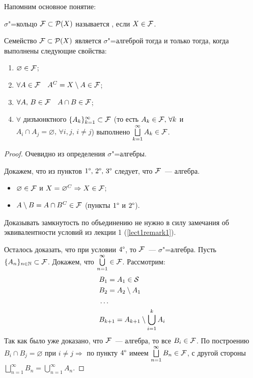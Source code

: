 Напомним основное понятие:
\begin{definition}
    $\sigma$"=кольцо $\mathcal{F} \subset\mathcal{P}(X)$ называется , если $X\in\mathcal{F} $.
\end{definition}

\begin{claim}[Критерий $\sigma$"=алгебры]
    Семейство $\mathcal{F} \subset \mathcal{P}(X)$ является $\sigma$"=алгеброй тогда и только тогда, когда выполнены следующие свойства:
    \begin{enumerate}[label=\arabic*\degree.]
        \item $\varnothing\in\mathcal{F} $;
        \item $\forall A\in\mathcal{F}  \quad A^C=X\setminus A\in\mathcal{F} $;
        \item $\forall A,\, B\in\mathcal{F} \quad A\cap B\in\mathcal{F} $;
        \item $\forall$ дизъюнктного $\{A_k\}_{k=1}^{\infty}\subset \mathcal{F} $ (то есть $A_k\in\mathcal{F} , \, \forall k$ и
              $A_i\cap A_j=\varnothing,\, \forall i,j,\, i\neq j$) выполнено $\bigsqcup\limits_{k=1}^{\infty}A_k\in\mathcal{F} $.
    \end{enumerate}

    \begin{proof}
        \circled{$\Rightarrow$} Очевидно из определения $\sigma$"=алгебры.

        \circled{$\Leftarrow$} Докажем, что из пунктов $1\degree, \, 2\degree,\, 3\degree$ следует, что $\mathcal{F} $~--- алгебра.
        \begin{itemize}
            \item $\varnothing\in\mathcal{F} $ и $X = \varnothing^C\Rightarrow X\in\mathcal{F} $;
            \item $A\setminus B = A\cap B^C\in\mathcal{F} $ (пункты $1\degree$ и $2\degree$).
        \end{itemize}
        \begin{remark}
            Доказывать замкнутость по объединению не нужно в силу замечания об эквивалентности условий из лекции 1 (\ref{lect1remark1}).
        \end{remark}

        Осталось доказать, что при условии $4\degree$, то $\mathcal{F} $~--- $\sigma$"=алгебра. Пусть
        $\{A_n\}_{n\in\mathbb{N}}\subset \mathcal{F} $. Докажем, что $\bigcup\limits_{n=1}^{\infty}\in\mathcal{F} $.
        Рассмотрим:
        \begin{align*}
             & B_1 = A_1\in\mathcal{S}                             \\
             & B_2 = A_2\setminus A_1                      \\
             & \ldots                                      \\
             & B_{k+1}=A_{k+1}\setminus\bigcup_{i=1}^k A_i
        \end{align*}
        Так как было уже доказано, что $\mathcal{F} $~--- алгебра, то все $B_i\in\mathcal{F} $. По построению $B_i\cap B_j=\varnothing$ при
        $i\neq j\Rightarrow$ по пункту $4\degree$ имеем $\bigsqcup\limits_{n=1}^{\infty}B_n\in\mathcal{F} $, с другой стороны
        $\bigsqcup\limits_{n=1}^{\infty}B_n = \bigcup\limits_{n=1}^{\infty}A_n$.

    \end{proof}
\end{claim}

